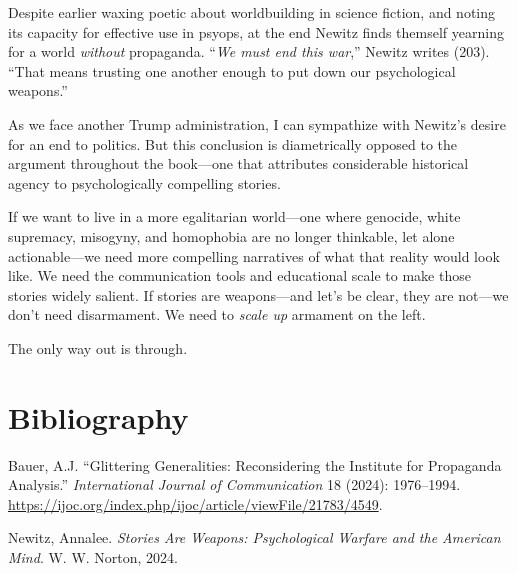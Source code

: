 \documentclass{tufte-handout}
\begin{document}
Despite earlier waxing poetic about worldbuilding in science fiction,
and noting its capacity for effective use in psyops, at the end Newitz
finds themself yearning for a world \emph{without} propaganda.
``\emph{We must end this war},'' Newitz writes (203). ``That means
trusting one another enough to put down our psychological weapons.''

As we face another Trump administration, I can sympathize with Newitz's
desire for an end to politics. But this conclusion is diametrically
opposed to the argument throughout the book---one that attributes
considerable historical agency to psychologically compelling stories.

If we want to live in a more egalitarian world---one where genocide,
white supremacy, misogyny, and homophobia are no longer thinkable, let
alone actionable---we need more compelling narratives of what that
reality would look like. We need the communication tools and educational
scale to make those stories widely salient. If stories are weapons---and
let's be clear, they are not---we don't need disarmament. We need to
\emph{scale up} armament on the left.

The only way out is through.




\section{Bibliography}\label{bibliography}

\begin{hangparas}{.25in}{1} 



Bauer, A.J. ``Glittering Generalities: Reconsidering the Institute for
Propaganda Analysis.'' \emph{International Journal of Communication} 18
(2024): 1976--1994.
\url{https://ijoc.org/index.php/ijoc/article/viewFile/21783/4549}.

Newitz, Annalee. \emph{Stories Are Weapons: Psychological Warfare and
the American Mind}. W. W. Norton, 2024.



\end{hangparas}
\end{document}

